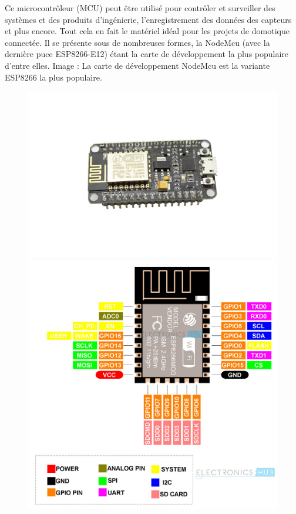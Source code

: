 \begin{flushleft}
		Ce microcontrôleur (MCU) peut être utilisé pour contrôler et surveiller des systèmes et des produits d’ingénierie, l’enregistrement des données des capteurs et plus encore. Tout cela en fait le matériel idéal pour les projets de domotique connectée. Il se présente sous de nombreuses formes, la NodeMcu (avec la dernière puce ESP8266-E12) étant la carte de développement la plus populaire d’entre elles. Image : La carte de développement NodeMcu est la variante ESP8266 la plus populaire.\newline
		\begin{figure}[h]
			\centering
			\includegraphics{chapitres/images/NodeMcu.jpg}
			\includegraphics{chapitres/images/ESP8266_12X.jpg}

\end{figure}
\end{flushleft}
